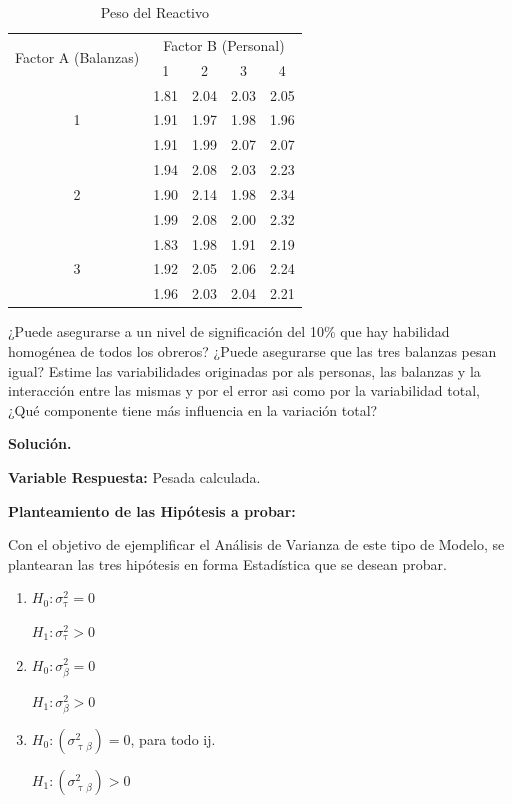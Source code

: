 \documentclass[12pt,letterpaper]{report}
\begin{document}
\begin{table}[htb]
\centering
\begin{tabular}{||c|c|c|c|c||}
\hline
\hline
\multirow{2}{*}{Factor A (Balanzas)} & \multicolumn{4}{c||}{Factor B (Personal)} \\
\cline{2-5}
                   &1&2&3&4 \\
\hline
\multirow{3}{*}{1} &1.81&2.04&2.03&2.05 \\
                   &1.91&1.97&1.98&1.96 \\
                   &1.91&1.99&2.07&2.07 \\
\hline
\multirow{3}{*}{2} &1.94&2.08&2.03&2.23 \\
                   &1.90&2.14&1.98&2.34 \\
                   &1.99&2.08&2.00&2.32 \\
\hline
\multirow{3}{*}{3} &1.83&1.98&1.91&2.19 \\
                   &1.92&2.05&2.06&2.24 \\
                   &1.96&2.03&2.04&2.21 \\

\hline
\hline

\end{tabular}
\caption{Peso del Reactivo}
\end{table}


¿Puede asegurarse a un nivel de significación del 10\% que hay habilidad homogénea de todos los obreros? ¿Puede asegurarse que las tres balanzas pesan igual? Estime las variabilidades originadas por als personas, las balanzas y la interacción entre las mismas y por el error asi como por la variabilidad total, ¿Qué componente tiene más influencia en la variación total?

\textbf{Solución.}

\textbf{Variable Respuesta:} Pesada calculada.

\textbf{Planteamiento de las Hipótesis a probar:}

Con el objetivo de ejemplificar el Análisis de Varianza de este tipo de Modelo, se plantearan
las tres hipótesis en forma Estadística que se desean probar.
\begin{enumerate}
\item $H_0 : \sigma^2_{\uptau} = 0$

      $H_1 : \sigma^2_{\uptau} > 0$

\item $H_0 : \sigma^2_{\beta} = 0$

      $H_1 : \sigma^2_{\beta} > 0$

\item $H_0 : (\sigma^2_{\uptau\beta}) = 0$, para todo ij.

      $H_1 : (\sigma^2_{\uptau\beta}) > 0$
\end{enumerate}
\end{document}

